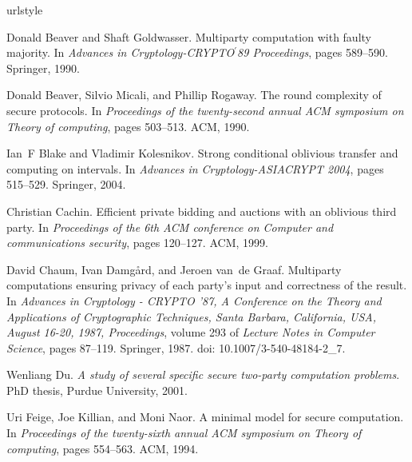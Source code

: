 \documentclass[11pt, letterpaper, romanappendices, onecolumn]{article}
\theoremstyle{plain}\newtheorem{thm}{Theorem}[section]
\theoremstyle{definition}
\theoremstyle{remark}
\begin{document}
\begin{thebibliography}{18}
\providecommand{\natexlab}[1]{#1}
\providecommand{\url}[1]{\texttt{#1}}
\expandafter\ifx\csname urlstyle\endcsname\relax
  \providecommand{\doi}[1]{doi: #1}\else
  \providecommand{\doi}{doi: \begingroup \urlstyle{rm}\Url}\fi

Donald Beaver and Shaft Goldwasser.
\newblock Multiparty computation with faulty majority.
\newblock In \emph{Advances in Cryptology-CRYPTO$^\prime$89 Proceedings}, pages
  589--590. Springer, 1990.

Donald Beaver, Silvio Micali, and Phillip Rogaway.
\newblock The round complexity of secure protocols.
\newblock In \emph{Proceedings of the twenty-second annual ACM symposium on
  Theory of computing}, pages 503--513. ACM, 1990.

Ian~F Blake and Vladimir Kolesnikov.
\newblock Strong conditional oblivious transfer and computing on intervals.
\newblock In \emph{Advances in Cryptology-ASIACRYPT 2004}, pages 515--529.
  Springer, 2004.

Christian Cachin.
\newblock Efficient private bidding and auctions with an oblivious third party.
\newblock In \emph{Proceedings of the 6th ACM conference on Computer and
  communications security}, pages 120--127. ACM, 1999.

David Chaum, Ivan Damgård, and Jeroen van~de Graaf.
\newblock Multiparty computations ensuring privacy of each party's input and
  correctness of the result.
\newblock In \emph{Advances in Cryptology - CRYPTO '87, A Conference on the
  Theory and Applications of Cryptographic Techniques, Santa Barbara,
  California, USA, August 16-20, 1987, Proceedings}, volume 293 of
  \emph{Lecture Notes in Computer Science}, pages 87--119. Springer, 1987.
\newblock \doi{10.1007/3-540-48184-2_7}.

Wenliang Du.
\newblock \emph{A study of several specific secure two-party computation
  problems}.
\newblock PhD thesis, Purdue University, 2001.

Uri Feige, Joe Killian, and Moni Naor.
\newblock A minimal model for secure computation.
\newblock In \emph{Proceedings of the twenty-sixth annual ACM symposium on
  Theory of computing}, pages 554--563. ACM, 1994.


\end{thebibliography}
\end{document}
